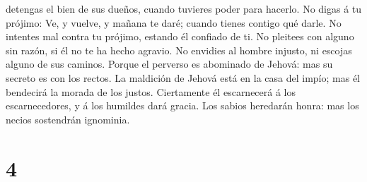detengas el bien de sus dueños, cuando tuvieres poder para hacerlo.
 No digas á tu prójimo: Ve, y vuelve, y mañana te daré;
cuando tienes contigo qué darle.  No intentes mal contra
tu prójimo, estando él confiado de ti.  No pleitees con
alguno sin razón, si él no te ha hecho agravio.  No
envidies al hombre injusto, ni escojas alguno de sus caminos.
 Porque el perverso es abominado de Jehová: mas su
secreto es con los rectos.  La maldición de Jehová está
en la casa del impío; mas él bendecirá la morada de los justos.
 Ciertamente él escarnecerá á los escarnecedores, y á los
humildes dará gracia.  Los sabios heredarán honra: mas
los necios sostendrán ignominia.

\hypertarget{section-3}{%
\section{4}\label{section-3}}

